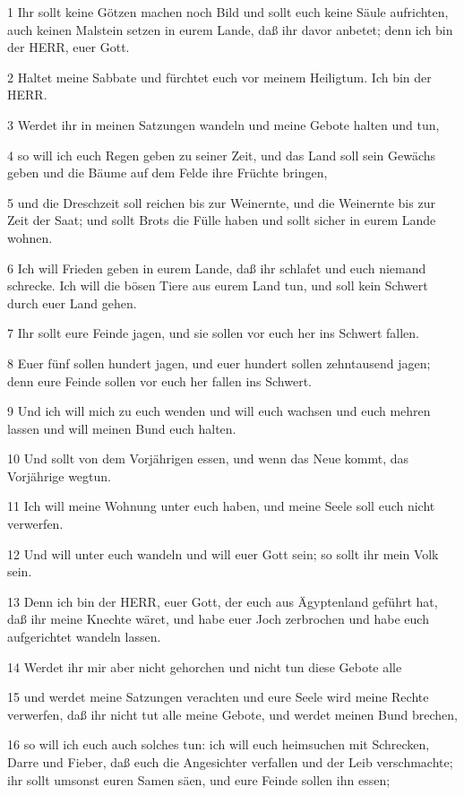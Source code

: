 \par 1 Ihr sollt keine Götzen machen noch Bild und sollt euch keine Säule aufrichten, auch keinen Malstein setzen in eurem Lande, daß ihr davor anbetet; denn ich bin der HERR, euer Gott.
\par 2 Haltet meine Sabbate und fürchtet euch vor meinem Heiligtum. Ich bin der HERR.
\par 3 Werdet ihr in meinen Satzungen wandeln und meine Gebote halten und tun,
\par 4 so will ich euch Regen geben zu seiner Zeit, und das Land soll sein Gewächs geben und die Bäume auf dem Felde ihre Früchte bringen,
\par 5 und die Dreschzeit soll reichen bis zur Weinernte, und die Weinernte bis zur Zeit der Saat; und sollt Brots die Fülle haben und sollt sicher in eurem Lande wohnen.
\par 6 Ich will Frieden geben in eurem Lande, daß ihr schlafet und euch niemand schrecke. Ich will die bösen Tiere aus eurem Land tun, und soll kein Schwert durch euer Land gehen.
\par 7 Ihr sollt eure Feinde jagen, und sie sollen vor euch her ins Schwert fallen.
\par 8 Euer fünf sollen hundert jagen, und euer hundert sollen zehntausend jagen; denn eure Feinde sollen vor euch her fallen ins Schwert.
\par 9 Und ich will mich zu euch wenden und will euch wachsen und euch mehren lassen und will meinen Bund euch halten.
\par 10 Und sollt von dem Vorjährigen essen, und wenn das Neue kommt, das Vorjährige wegtun.
\par 11 Ich will meine Wohnung unter euch haben, und meine Seele soll euch nicht verwerfen.
\par 12 Und will unter euch wandeln und will euer Gott sein; so sollt ihr mein Volk sein.
\par 13 Denn ich bin der HERR, euer Gott, der euch aus Ägyptenland geführt hat, daß ihr meine Knechte wäret, und habe euer Joch zerbrochen und habe euch aufgerichtet wandeln lassen.
\par 14 Werdet ihr mir aber nicht gehorchen und nicht tun diese Gebote alle
\par 15 und werdet meine Satzungen verachten und eure Seele wird meine Rechte verwerfen, daß ihr nicht tut alle meine Gebote, und werdet meinen Bund brechen,
\par 16 so will ich euch auch solches tun: ich will euch heimsuchen mit Schrecken, Darre und Fieber, daß euch die Angesichter verfallen und der Leib verschmachte; ihr sollt umsonst euren Samen säen, und eure Feinde sollen ihn essen;
